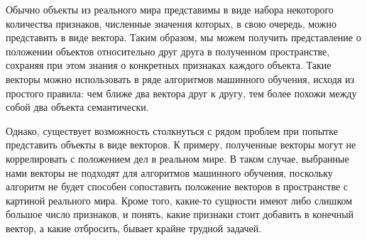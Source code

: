 \documentclass[times,specification,annotation]{itmo-student-thesis}
\begin{document}





\tableofcontents

\startprefacepage

\startrelatedwork

Обычно объекты из реального мира представимы в виде набора некоторого
количества признаков, численные значения которых, в свою очередь, можно
представить в виде вектора. Таким образом, мы можем получить представление о
положении объектов относительно друг друга в полученном пространстве,
сохраняя при этом знания о конкретных признаках каждого объекта. Такие
векторы можно использовать в ряде алгоритмов машинного обучения, исходя из
простого правила: чем ближе два вектора друг к другу, тем более похожи между
собой два объекта семантически.

Однако, существует возможность столкнуться с рядом проблем при попытке
представить объекты в виде векторов. К примеру, полученные векторы могут не
коррелировать с положением дел в реальном мире. В таком случае, выбранные
нами векторы не подходят для алгоритмов машинного обучения, поскольку
алгоритм не будет способен сопоставить положение векторов в пространстве с картиной
реального мира. Кроме того, какие-то сущности имеют либо слишком большое
число признаков, и понять, какие признаки стоит добавить в конечный вектор, а
какие отбросить, бывает крайне трудной задачей.
\end{document}
